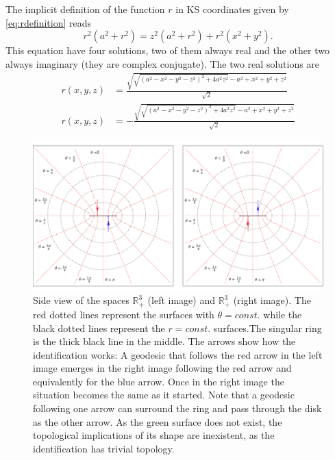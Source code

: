 \begin{Proof}
 The implicit definition of the function $r$ in \gls{KS} coordinates given by \cref{eq:rdefinition} reads
 \begin{equation}\label{eq:rrelationident}
  r^2 \left(a^2+r^2\right)=z^2 \left(a^2+r^2\right)+r^2 \left(x^2+y^2\right).
 \end{equation}
 This equation have four solutions, two of them always real and the other two always imaginary (they are complex conjugate). The two real solutions are
 \begin{align}
  r(x,y,z)&=\frac{\sqrt{\sqrt{\left(a^2-x^2-y^2-z^2\right)^2+4 a^2 z^2}-a^2+x^2+y^2+z^2}}{\sqrt{2}}\\
  r(x,y,z)&=-\frac{\sqrt{\sqrt{\left(a^2-x^2-y^2-z^2\right)^2+4 a^2 z^2}-a^2+x^2+y^2+z^2}}{\sqrt{2}}
 \end{align}
  \begin{figure}   
\begin{center}
 \centerline{\includegraphics[width=\textwidth]{img/Chapter2/Idetification2.pdf}}
 \end{center}
 \caption{Side view of the spaces $\mathbb{R}_+^3$ (left image) and $\mathbb{R}_+^3$ (right image). The red dotted lines represent the surfaces with $\theta=const.$ while the black dotted lines represent the $r=const.$ surfaces.The singular ring is the thick black line in the middle. The arrows show how the identification works: A geodesic that follows the red arrow in the left image emerges in the right image following the red arrow and equivalently for the blue arrow. Once in the right image the situation becomes the same as it started. Note that a geodesic following one arrow can surround the ring and pass through the disk as the other arrow. As the green surface does not exist, the topological implications of its shape are inexistent, as the identification has trivial topology. }
 \label{fig:Identification2}

\end{figure}
\end{Proof}
